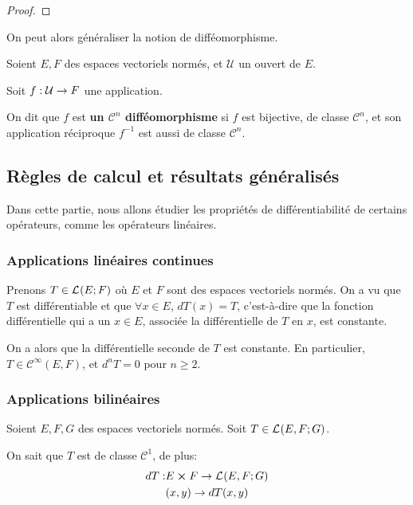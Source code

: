 \ifdefined\outputproof
\begin{proof}

\end{proof}
\fi

On peut alors généraliser la notion de difféomorphisme.

\begin{definition}
	Soient $E, F$ des espaces vectoriels normés, et $\mathcal{U}$ un ouvert de
	$E$.

	Soit $f : \mathcal{U} \rightarrow F$ une application.

	On dit que $f$ est \textbf{un $\mathcal{C}^{n}$ difféomorphisme} si $f$ est
	bijective, de classe $\mathcal{C}^{n}$, et son application réciproque
	$f^{-1}$ est aussi de classe $\mathcal{C}^{n}$.
\end{definition}

\subsection{Règles de calcul et résultats généralisés}

Dans cette partie, nous allons étudier les propriétés de différentiabilité de
certains opérateurs, comme les opérateurs linéaires.

\subsubsection{Applications linéaires continues}

Prenons $T \in \mathcal{L}_{}(E; F)$ où $E$ et $F$ sont des espaces vectoriels
normés.
On a vu que $T$ est différentiable et que $\forall x \in E$, $dT(x) = T$,
c'est-à-dire que la fonction différentielle qui a un $x \in E$, associée la
différentielle de $T$ en $x$, est constante.

On a alors que la différentielle seconde de $T$ est constante. En particulier,
$T \in \mathcal{C}^{\infty}(E, F)$, et $d^{n}T = 0$ pour $n \geq 2$.

\subsubsection{Applications bilinéaires}

Soient $E, F, G$ des espaces vectoriels normés.
Soit $T \in \mathcal{L}_{}(E, F; G)$.

On sait que $T$ est de classe $\mathcal{C}^{1}$, de plus:
\begin{align*}
	dT : & E \cross F \rightarrow \mathcal{L}_{}(E, F; G) \\
	& (x, y) \rightarrow dT(x, y)
\end{align*}

